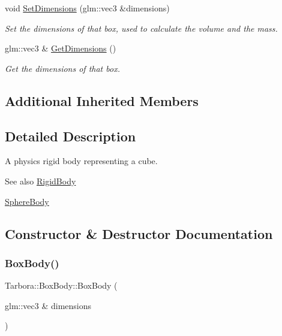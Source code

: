\begin{DoxyCompactItemize}
void \hyperlink{classTarbora_1_1BoxBody_ae4b822b4acb781e9fdec907e8a92b27b}{Set\+Dimensions} (glm\+::vec3 \&dimensions)
\begin{DoxyCompactList}\small\item\em Set the dimensions of that box, used to calculate the volume and the mass. \end{DoxyCompactList}\item 
\mbox{\label{classTarbora_1_1BoxBody_a2c833613435aa7244e39f14460a792c6}} 
glm\+::vec3 \& \hyperlink{classTarbora_1_1BoxBody_a2c833613435aa7244e39f14460a792c6}{Get\+Dimensions} ()
\begin{DoxyCompactList}\small\item\em Get the dimensions of that box. \end{DoxyCompactList}\end{DoxyCompactItemize}
\subsection*{Additional Inherited Members}


\subsection{Detailed Description}
A physics rigid body representing a cube. 

\begin{DoxySeeAlso}{See also}
\hyperlink{classTarbora_1_1RigidBody}{Rigid\+Body} 

\hyperlink{classTarbora_1_1SphereBody}{Sphere\+Body} 
\end{DoxySeeAlso}


\subsection{Constructor \& Destructor Documentation}
\mbox{\label{classTarbora_1_1BoxBody_a4588faa74c221c9f484432bc3b7a0674}} 
\subsubsection{\texorpdfstring{Box\+Body()}{BoxBody()}}
{\footnotesize\ttfamily Tarbora\+::\+Box\+Body\+::\+Box\+Body (\begin{DoxyParamCaption}\item[{glm\+::vec3 \&}]{dimensions }\end{DoxyParamCaption})}



